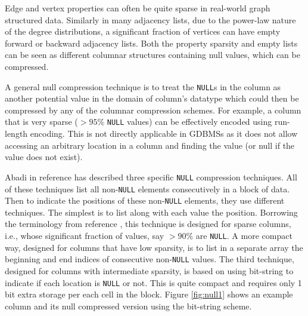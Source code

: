 Edge and vertex properties can often be quite sparse in real-world graph structured data. Similarly in many adjacency lists, due to the power-law nature of the degree distributions, a significant fraction of vertices can have empty forward or backward adjacency lists. Both the property sparsity and empty lists can be seen as different columnar structures containing null values, which can be compressed.


A general null compression technique is to treat the \texttt{NULL}s in the column as another potential value in the domain of column's datatype which could then be compressed by any of the columnar compression schemes. For example, a column that is very sparse ($>95\%$ \texttt{NULL} values) can be effectively encoded using run-length encoding. This is not directly applicable in GDBMSs as it does not allow accessing an arbitrary location in a column and finding the value (or null if the value does not exist).

Abadi in reference \cite{abadi-sparse-col} has described three specific \texttt{NULL} compression techniques. All of these techniques list all non-\texttt{NULL} elements consecutively in a block of data. Then to indicate the positions of these non-\texttt{NULL} elements, they use different techniques. The simplest is to list along with each value the position. Borrowing the terminology from reference \cite{abadi-sparse-col}, this technique is designed for sparse columns, i.e., whose significant fraction of values, say $> 90\%$ are \texttt{NULL}. A more compact way, designed for columns that have low sparsity, is to list in a separate array the beginning and end indices of consecutive non-\texttt{NULL} values. The third technique, designed for columns with intermediate sparsity, is based on using bit-string to indicate if each location is \texttt{NULL} or not.  This is quite compact and requires only 1 bit extra storage per each cell in the block. Figure \ref{fig:null1} shows an example column and its null compressed version using the bit-string scheme. 

